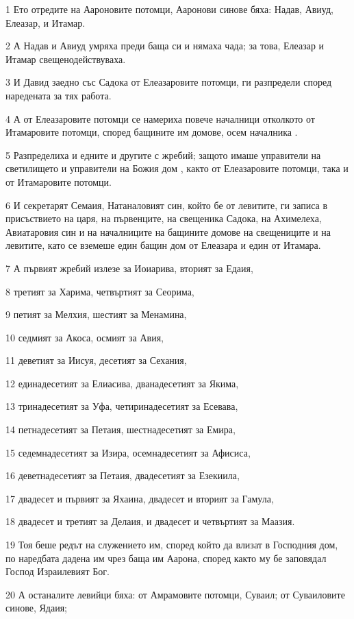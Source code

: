 \par 1 Ето отредите на Аароновите потомци, Ааронови синове бяха: Надав, Авиуд, Елеазар, и Итамар.
\par 2 А Надав и Авиуд умряха преди баща си и нямаха чада; за това, Елеазар и Итамар свещенодействуваха.
\par 3 И Давид заедно със Садока от Елеазаровите потомци, ги разпредели според наредената за тях работа.
\par 4 А от Елеазаровите потомци се намериха повече началници отколкото от Итамаровите потомци, според бащините им домове, осем началника .
\par 5 Разпределиха и едните и другите с жребий; защото имаше управители на светилището и управители на Божия дом , както от Елеазаровите потомци, така и от Итамаровите потомци.
\par 6 И секретарят Семаия, Натаналовият син, който бе от левитите, ги записа в присъствието на царя, на първенците, на свещеника Садока, на Ахимелеха, Авиатаровия син и на началниците на бащините домове на свещениците и на левитите, като се вземеше един бащин дом от Елеазара и един от Итамара.
\par 7 А първият жребий излезе за Иоиарива, вторият за Едаия,
\par 8 третият за Харима, четвъртият за Сеорима,
\par 9 петият за Мелхия, шестият за Менамина,
\par 10 седмият за Акоса, осмият за Авия,
\par 11 деветият за Иисуя, десетият за Сехания,
\par 12 единадесетият за Елиасива, дванадесетият за Якима,
\par 13 тринадесетият за Уфа, четиринадесетият за Есевава,
\par 14 петнадесетият за Петаия, шестнадесетият за Емира,
\par 15 седемнадесетият за Изира, осемнадесетият за Афисиса,
\par 16 деветнадесетият за Петаия, двадесетият за Езекиила,
\par 17 двадесет и първият за Яхаина, двадесет и вторият за Гамула,
\par 18 двадесет и третият за Делаия, и двадесет и четвъртият за Маазия.
\par 19 Тоя беше редът на служението им, според който да влизат в Господния дом, по наредбата дадена им чрез баща им Аарона, според както му бе заповядал Господ Израилевият Бог.
\par 20 А останалите левийци бяха: от Амрамовите потомци, Суваил; от Суваиловите синове, Ядаия;
